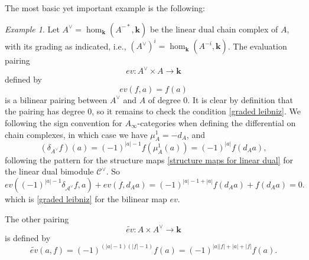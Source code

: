\documentclass[11pt]{amsproc}
\def\K{{\mathbf{k}}}
\def\A{\mathcal{A}}
\def\cc{\mathcal{C}}
\def\mc#1{\mathcal{#1}}
\def\d{\delta}
\def\ainf{A_\infty}
\def\A{\mc{A}}
\theoremstyle{remark}
\newtheorem{example}{Example}[section]
\numberwithin{equation}{section}
\begin{document}
The most basic yet important example is the following:

\begin{example}
Let $A^{\vee} = \hom_{\K}(A^{-*}, \K)$ be the linear dual chain complex of $A$, 
with its grading as indicated, i.e., $(A^{\vee})^{i} = \hom_{\K}(A^{-i}, \K)$.
The evaluation pairing 
\begin{equation}\label{evaluation on a}
ev: A^{\vee} \times A \to \K
\end{equation}
defined by 
\begin{equation}
ev(f, a) = f(a)
\end{equation}
is a bilinear pairing between $A^{\vee}$ and $A$ of degree $0$.
It is clear by definition that the pairing has degree $0$,
so it remains to check the condition \eqref{graded leibniz}.
We following the sign convention for $\ainf$-categories when defining the differential on chain complexes,
in which case we have $\mu^{1}_{A} = -d_{A}$, and
\begin{equation}
 (\d_{A^{\vee}}f)(a) = (-1)^{|a| - 1}f(\mu^{1}_{A}(a)) = (-1)^{|a|} f(d_{A} a),
\end{equation}
following the pattern for the structure maps \eqref{structure maps for linear dual} for the linear dual bimodule $\cc^{\vee}$.
So
\begin{equation}\label{skew symmetry for ev}
ev((-1)^{|a|-1} \d_{\A^{\vee}}f, a) + ev(f, d_{A}a) = (-1)^{|a|-1+|a|} f(d_{A}a) + f(d_{A}a) = 0.
\end{equation}
which is \eqref{graded leibniz} for the bilinear map $ev$.

The other pairing
\begin{equation}\label{evaluation on a opp}
\tilde{ev}: A \times A^{\vee} \to \K
\end{equation}
is defined by 
\begin{equation}
\tilde{ev}(a, f) = (-1)^{(|a|-1)(|f|-1)} f(a) = (-1)^{|a||f| + |a| + |f|} f(a).
\end{equation}
\end{example}
\end{document}
